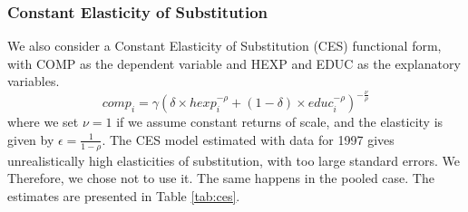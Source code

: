 \documentclass[12pt,a4paper]{article}\usepackage[]{graphicx}\usepackage[]{color}
\begin{document}
\subsubsection{Constant Elasticity of Substitution}
We also consider a Constant Elasticity of Substitution (CES) functional form, with COMP as the dependent variable and HEXP and EDUC as the explanatory variables.
\begin{equation}
comp_i = \gamma \left( \delta \times hexp_i^{-\rho} + (1- \delta) \times educ_i^{-\rho} \right)^{-\frac{\nu}{\rho}}
\end{equation}
where we set $\nu = 1$ if we assume constant returns of scale, and the elasticity is given by $\epsilon = \frac{1}{1- \rho}$. The CES model estimated with data for 1997 gives unrealistically high elasticities of substitution, with too large standard errors. We Therefore, we chose not to use it. The same happens in the pooled case. The estimates are presented in Table \ref{tab:ces}.
\end{document}
